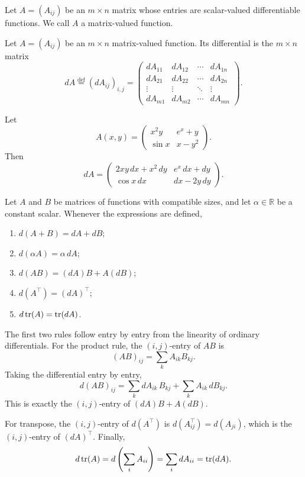 Let $A=(A_{ij})$ be an $m\times n$ matrix whose entries are scalar-valued differentiable functions. We call $A$ a matrix-valued function.

\begin{definition}
Let $A=(A_{ij})$ be an $m\times n$ matrix-valued function. Its differential is the $m\times n$ matrix
\[
    dA
    \overset{\mathrm{def}}{=}
    (dA_{ij})_{i,j}
    =
    \begin{pmatrix}
        dA_{11} & dA_{12} & \cdots & dA_{1n}\\
        dA_{21} & dA_{22} & \cdots & dA_{2n}\\
        \vdots & \vdots & \ddots & \vdots\\
        dA_{m1} & dA_{m2} & \cdots & dA_{mn}
    \end{pmatrix}.
\]
\end{definition}

\begin{example}
Let
\[
    A(x,y)
    =
    \begin{pmatrix}
        x^2y & e^x+y\\
        \sin x & x-y^2
    \end{pmatrix}.
\]
Then
\[
    dA
    =
    \begin{pmatrix}
        2xy\,dx+x^2\,dy & e^x\,dx+dy\\
        \cos x\,dx & dx-2y\,dy
    \end{pmatrix}.
\]
\end{example}


\begin{theorem}
Let $A$ and $B$ be matrices of functions with compatible sizes, and let $\alpha\in\mathbb{R}$ be a constant scalar. Whenever the expressions are defined,
\begin{enumerate}
    \item $d(A+B)=dA+dB$;
    \item $d(\alpha A)=\alpha\,dA$;
    \item $d(AB)=(dA)B+A(dB)$;
    \item $d(A^{\top})=(dA)^{\top}$;
    \item $d\operatorname{tr}(A)=\operatorname{tr}(dA)$.
\end{enumerate}
\end{theorem}

\begin{pfbox}
The first two rules follow entry by entry from the linearity of ordinary differentials.
For the product rule, the $(i,j)$-entry of $AB$ is
\[
    (AB)_{ij}=\sum_k A_{ik}B_{kj}.
\]
Taking the differential entry by entry,
\[
    d(AB)_{ij}
    =
    \sum_k dA_{ik}\,B_{kj}+
    \sum_k A_{ik}\,dB_{kj}.
\]
This is exactly the $(i,j)$-entry of $(dA)B+A(dB)$.

For transpose, the $(i,j)$-entry of $d(A^{\top})$ is $d(A^{\top}_{ij})=d(A_{ji})$, which is the $(i,j)$-entry of $(dA)^{\top}$.
Finally,
\[
    d\operatorname{tr}(A)
    =d\left(\sum_i A_{ii}\right)
    =\sum_i dA_{ii}
    =\operatorname{tr}(dA).
\]
\end{pfbox}

